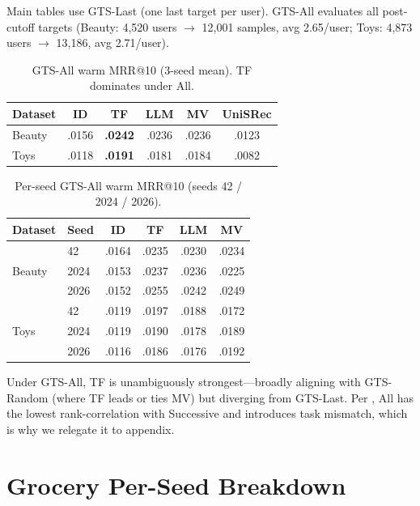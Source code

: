 \documentclass[sigconf,natbib=true,anonymous]{acmart}
\begin{document}
Main tables use GTS-Last (one last target per user).
GTS-All evaluates all post-cutoff targets (Beauty: 4{,}520 users $\to$ 12{,}001 samples, avg 2.65/user; Toys: 4{,}873 users $\to$ 13{,}186, avg 2.71/user).

\begin{table}[h]
\centering
\caption{GTS-All warm MRR@10 (3-seed mean).  TF dominates under All.}
\label{tab:gts-all}
\small
\begin{tabular}{@{}lccccc@{}}
\toprule
Dataset & ID & TF & LLM & MV & UniSRec \\
\midrule
Beauty & .0156 & \textbf{.0242} & .0236 & .0236 & .0123 \\
Toys   & .0118 & \textbf{.0191} & .0181 & .0184 & .0082 \\
\bottomrule
\end{tabular}
\end{table}

\begin{table}[h]
\centering
\caption{Per-seed GTS-All warm MRR@10 (seeds 42 / 2024 / 2026).}
\label{tab:gts-all-perseed}
\small
\setlength{\tabcolsep}{3.5pt}
\begin{tabular}{@{}llcccc@{}}
\toprule
Dataset & Seed & ID & TF & LLM & MV \\
\midrule
\multirow{3}{*}{Beauty}
 & 42    & .0164 & .0235 & .0230 & .0234 \\
 & 2024  & .0153 & .0237 & .0236 & .0225 \\
 & 2026  & .0152 & .0255 & .0242 & .0249 \\
\midrule
\multirow{3}{*}{Toys}
 & 42    & .0119 & .0197 & .0188 & .0172 \\
 & 2024  & .0119 & .0190 & .0178 & .0189 \\
 & 2026  & .0116 & .0186 & .0176 & .0192 \\
\bottomrule
\end{tabular}
\end{table}

Under GTS-All, TF is unambiguously strongest---broadly aligning with GTS-Random (where TF leads or ties MV) but diverging from GTS-Last.
Per \citet{liang2024timetosplit}, All has the lowest rank-correlation with Successive and introduces task mismatch, which is why we relegate it to appendix.

\section{Grocery Per-Seed Breakdown}
\label{app:grocery}
\end{document}
